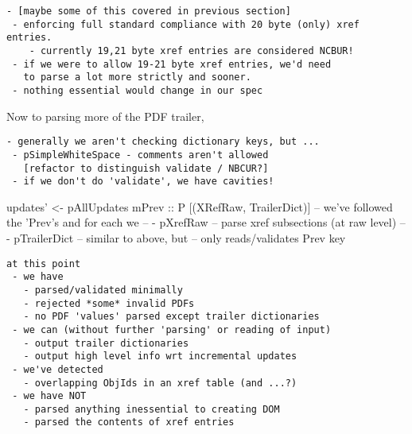 \begin{lstlisting}[style=meta]
 - [maybe some of this covered in previous section]
 - enforcing full standard compliance with 20 byte (only) xref entries.
    - currently 19,21 byte xref entries are considered NCBUR!
 - if we were to allow 19-21 byte xref entries, we'd need
   to parse a lot more strictly and sooner.
 - nothing essential would change in our spec
\end{lstlisting}
Now to parsing more of the PDF trailer,

\begin{lstlisting}[style=meta]
 - generally we aren't checking dictionary keys, but ...
 - pSimpleWhiteSpace - comments aren't allowed
   [refactor to distinguish validate / NBCUR?]
 - if we don't do 'validate', we have cavities!
\end{lstlisting}
\begin{code}
    updates' <- pAllUpdates mPrev :: P [(XRefRaw, TrailerDict)]
       -- we've followed the 'Prev's and for each we
       --   - pXrefRaw     -- parse xref subsections (at raw level)
       --   - pTrailerDict -- similar to above, but
       --                     only reads/validates Prev key
\end{code}

\begin{lstlisting}[style=meta]
at this point
 - we have
   - parsed/validated minimally
   - rejected *some* invalid PDFs
   - no PDF 'values' parsed except trailer dictionaries
 - we can (without further 'parsing' or reading of input)
   - output trailer dictionaries
   - output high level info wrt incremental updates
 - we've detected
   - overlapping ObjIds in an xref table (and ...?)
 - we have NOT
   - parsed anything inessential to creating DOM
   - parsed the contents of xref entries
\end{lstlisting}

